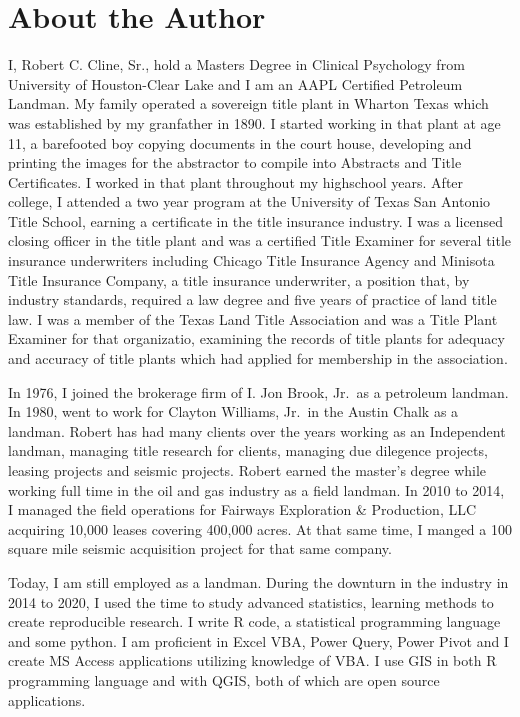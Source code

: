 \documentclass[
]{book}
\theoremstyle{definition}
\theoremstyle{definition}
\theoremstyle{definition}
\theoremstyle{definition}
\theoremstyle{remark}
\begin{document}
\hypertarget{about-the-author}{%
\section{About the Author}\label{about-the-author}}

I, Robert C. Cline, Sr., hold a Masters Degree in Clinical Psychology from University of Houston-Clear Lake and I am an AAPL Certified Petroleum Landman. My family operated a sovereign title plant in Wharton Texas which was established by my granfather in 1890. I started working in that plant at age 11, a barefooted boy copying documents in the court house, developing and printing the images for the abstractor to compile into Abstracts and Title Certificates. I worked in that plant throughout my highschool years. After college, I attended a two year program at the University of Texas San Antonio Title School, earning a certificate in the title insurance industry. I was a licensed closing officer in the title plant and was a certified Title Examiner for several title insurance underwriters including Chicago Title Insurance Agency and Minisota Title Insurance Company, a title insurance underwriter, a position that, by industry standards, required a law degree and five years of practice of land title law. I was a member of the Texas Land Title Association and was a Title Plant Examiner for that organizatio, examining the records of title plants for adequacy and accuracy of title plants which had applied for membership in the association.

In 1976, I joined the brokerage firm of I. Jon Brook, Jr.~as a petroleum landman. In 1980, went to work for Clayton Williams, Jr.~in the Austin Chalk as a landman. Robert has had many clients over the years working as an Independent landman, managing title research for clients, managing due dilegence projects, leasing projects and seismic projects. Robert earned the master's degree while working full time in the oil and gas industry as a field landman. In 2010 to 2014, I managed the field operations for Fairways Exploration \& Production, LLC acquiring 10,000 leases covering 400,000 acres. At that same time, I manged a 100 square mile seismic acquisition project for that same company.

Today, I am still employed as a landman. During the downturn in the industry in 2014 to 2020, I used the time to study advanced statistics, learning methods to create reproducible research. I write R code, a statistical programming language and some python. I am proficient in Excel VBA, Power Query, Power Pivot and I create MS Access applications utilizing knowledge of VBA. I use GIS in both R programming language and with QGIS, both of which are open source applications.
\end{document}
